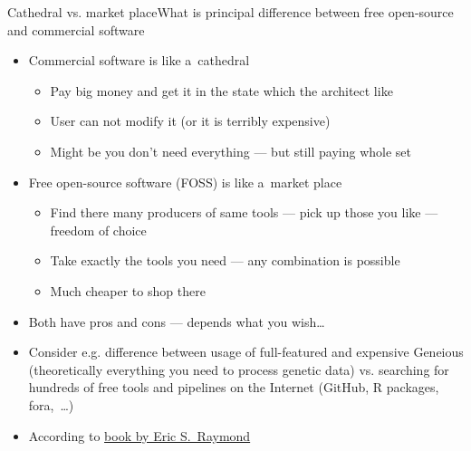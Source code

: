 \documentclass[compress, ucs, xelatex, 11pt, xcolor=svgnames, aspectratio=169,
	hyperref={
		bookmarks=true,
		unicode=true,
		colorlinks=true,
		pdftitle={Linux, command line and MetaCentrum},
		plainpages=false,
		pdfauthor={Vojtech Zeisek},
		pdfsubject={Course about use of Linux command line, writing shell scripts and using MetaCentrum of CESNET},
		pdfcreator={XeLaTeX},
		pdfkeywords={Linux, GNU, BASH, shell, command line, MetaCentrum},
		linkcolor=DarkRed, %
		anchorcolor=DarkBlue, %
		citecolor=Indigo, %
		filecolor=NavyBlue, %
		menucolor=DarkMagenta, %
		urlcolor=DarkBlue, %
		pdftex},
	url={hyphens, lowtilde} %
	]{beamer}
\begin{document}
\begin{frame}{Cathedral vs. market place}{What is principal difference between free open-source and commercial software}
	\begin{itemize}
		\item Commercial software is like a~cathedral
		\begin{itemize}
			\item Pay big money and get it in the state which the architect like
			\item User can not modify it (or it is terribly expensive)
			\item Might be you don't need everything --- but still paying whole set
		\end{itemize}
		\item Free open-source software (FOSS) is like a~market place
		\begin{itemize}
			\item Find there many producers of same tools --- pick up those you like --- freedom of choice
			\item Take exactly the tools you need --- any combination is possible
			\item Much cheaper to shop there
		\end{itemize}
		\item Both have pros and cons --- depends what you wish\ldots
		\item Consider e.g. difference between usage of full-featured and expensive Geneious (theoretically everything you need to process genetic data) vs. searching for hundreds of free tools and pipelines on the Internet (GitHub, R packages, fora,~\ldots)
		\item According to \href{https://en.wikipedia.org/wiki/The_Cathedral_and_the_Bazaar}{book by Eric S.~Raymond}
	\end{itemize}
\end{frame}
\end{document}
